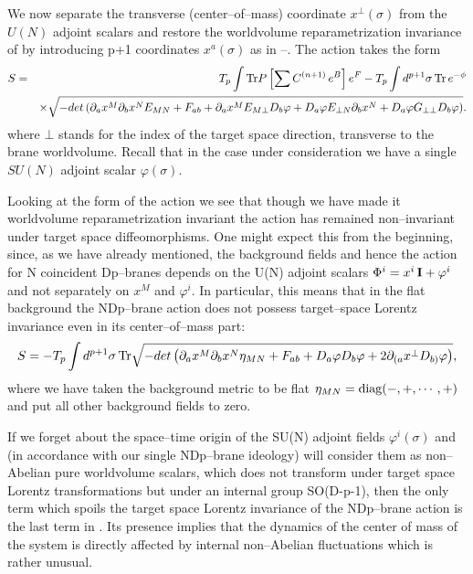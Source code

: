 \documentclass[a4paper,12pt]{article}
\begin{document}
We now separate the transverse (center--of--mass) coordinate
$x^\bot(\sigma)$ from the $U(N)$ adjoint scalars and restore the worldvolume
reparametrization invariance of  by introducing p+1
coordinates $x^a(\sigma)$ as in --. The action 
takes the form
\begin{eqnarray}\label{6}
{S}&=&T_p\int {\rm
Tr}P\left[\sum C^{(n+1)}\,e^B\right]e^{F}-T_p \int
d^{p+1}\sigma\,{\rm Tr}\,e^{-\phi}\\
 &&\times \sqrt{-det\left(
\partial_ax^M\partial_bx^NE_{MN}+ F_{ab}+
\partial_ax^ME_{M\bot}D_b\varphi+D_a\varphi
E_{\bot N}\partial_bx^N+ D_a\varphi
G_{\bot\bot}D_b\varphi\right)}.\nonumber
\end{eqnarray}
where $\bot$ stands for the index of the target space direction,
transverse to the brane worldvolume. Recall that in the case under
consideration we have a single $SU(N)$ adjoint scalar
$\varphi(\sigma)$.

Looking at the form of the action  we see that though we have
made it worldvolume reparametrization invariant the action has
remained non--invariant under target space diffeomorphisms. One
might expect this from the beginning, since, as we have already
mentioned, the background fields and hence the action for N
coincident Dp--branes depends on the U(N) adjoint scalars
$\Phi^i=x^i\,{\bf I}+\varphi^i$ and not separately on $x^M$ and
$\varphi^i$. In particular, this means that in the flat background
the NDp--brane action does not possess target--space Lorentz
invariance even in its center--of--mass part:
\begin{equation}\label{8}
S=- T_p \int d^{p+1}\sigma\,{\rm Tr}
\sqrt{-det\left(
\partial_ax^M\partial_bx^N\eta_{MN}+ F_{ab}+ D_a\varphi D_b\varphi+
2\partial_{(a}x^\bot D_{b)}\varphi\right)},
\end{equation}
where we have taken the background metric to be flat
$\eta_{MN}={\rm diag}(-,+,\cdots,+)$ and put all other background
fields to zero.

If we forget about the space--time origin of the SU(N) adjoint
fields $\varphi^i(\sigma)$ and (in accordance with our single
NDp--brane ideology) will consider them as  non--Abelian pure
worldvolume scalars, which does not transform under target space
Lorentz transformations but under an internal group SO(D-p-1),
then the only term which spoils the target space Lorentz
invariance of the NDp--brane action is the last term in . Its
presence implies that the dynamics of the center of mass of the
system is directly affected by internal non--Abelian fluctuations
which is rather unusual.
\end{document}
